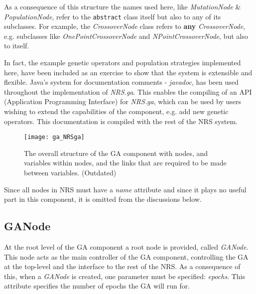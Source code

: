 \documentclass[10pt, notitlepage, a4paper]{article}
\begin{document}
As a consequence of this structure the names used here, like  {\it MutationNode} \& {\it PopulationNode}, refer to the {\tt abstract} class itself but also to any of its subclasses. For example, the {\it CrossoverNode} class refers to {\bf any} {\it CrossoverNode}, e.g. subclasses like {\it OnePointCrossoverNode} and {\it NPointCrossoverNode}, but also to itself.

In fact, the example genetic operators and population strategies implemented here, have been included as an exercise to show that the system is extensible and flexible. Java's system for documentation comments - {\it javadoc}, has been used throughout the implementation of {\it NRS.ga}. This enables the compiling of an API (Application Programming Interface) for {\it NRS.ga}, which can be used by users wishing to extend the capabilities of the component, e.g. add new genetic operators. This documentation is compiled with the rest of the NRS system.

\begin{figure}[ht]
\begin{center}
\texttt{[image: ga\_NRSga]}\\
\end{center}
\caption{The overall structure of the GA component with nodes, and variables within nodes, and the links that are required to be made between variables. (Outdated)}
\label{struct_dia}
\end{figure}

Since all nodes in NRS must have a {\it name} attribute and since it plays no useful part in this component, it is omitted from the discussions below.

\subsection{GANode}
At the root level of the GA component a root node is provided, called {\it GANode}. This node acts as the main controller of the GA component, controlling the GA at the top-level and the interface to the rest of the NRS. As a consequence of this, when a {\it GANode} is created, one parameter must be specified: {\it epochs}. This attribute specifies the number of epochs the GA will run for.
\end{document}
